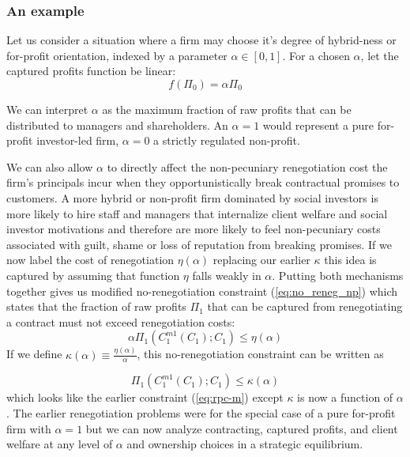 \documentclass[11pt,english]{article}
\theoremstyle{plain}
\theoremstyle{definition}
\begin{document}
\subsubsection{An example}

Let us consider a situation where a firm may choose it's degree
of hybrid-ness or for-profit orientation, indexed by a parameter $\alpha\in\left[0,1\right]$.
For a chosen $\alpha$, let the captured profits function be linear:
\begin{equation}
f\left(\Pi_{0}\right)=\alpha\Pi_{0}
\end{equation}


We can interpret $\alpha$ as the maximum fraction of raw
profits that can be distributed to managers and shareholders. An $\alpha=1$
would represent a pure for-profit investor-led firm, $\alpha=0$ a
strictly regulated non-profit.

We can also allow $\alpha$ to directly affect the non-pecuniary
renegotiation cost the firm's principals incur when they opportunistically
break contractual promises to customers. A more hybrid or non-profit
firm dominated by social investors is more likely to hire staff and
managers that internalize client welfare and social investor motivations
and therefore are more likely to feel non-pecuniary costs associated
with guilt, shame or loss of reputation from breaking promises. If
we now label the cost of renegotiation $\eta\left(\alpha\right)$
\textendash{} replacing our earlier $\kappa$ \textendash{} this idea
is captured by assuming that function $\eta$ falls weakly in $\alpha$.
Putting both mechanisms together gives us modified no-renegotiation
constraint (\ref{eq:no_reneg_np}) which states that the fraction
of raw profits $\Pi_{1}$ that can be captured from renegotiating
a contract must not exceed renegotiation costs: 
\begin{equation}
\alpha\Pi_{1}(C_{1}^{m1}(C_{1});C_{1})\leq\eta(\alpha)\label{eq:no_reneg_np}
\end{equation}
If we define $\kappa(\alpha)\equiv\frac{\eta(\alpha)}{\alpha}$, this
no-renegotiation constraint can be written as

\begin{equation}
  \Pi_{1}(C_{1}^{m1}(C_{1});C_{1})\leq\kappa(\alpha)\label{eq:no-kalpha}
\end{equation}
which looks like the earlier constraint (\ref{eq:rpc-m})
except $\kappa$ is now a function of $\alpha$. The earlier renegotiation
problems were for the special case of a pure for-profit firm with
$\alpha=1$ but we can now analyze contracting, captured profits,
and client welfare at any level of $\alpha$ and ownership choices
in a strategic equilibrium. 
\end{document}
